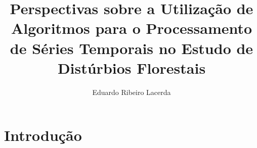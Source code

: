\documentclass[twocolumn]{article}
\title{Perspectivas sobre a Utilização de Algoritmos para o Processamento de Séries Temporais no Estudo de Distúrbios Florestais}
\author{Eduardo Ribeiro Lacerda }
\date{} %
\providecommand{\keywords}[1]
    {
      \small	
      \textbf{\text{Palavras-chave---}} #1
    }
\begin{document}
\maketitle

\begin{comment}
    \begin{abstract}
        O objetivo deste trabalho é apresentar o estado da arte sobre a aplicação de técnicas de análise e séries temporais em imagens de satélite orbitais para o estudo de áreas de floresta que sofreram ou não algum tipo de distúrbio.    
    \end{abstract}
\end{comment}


\section{Introdução}
\end{document}
